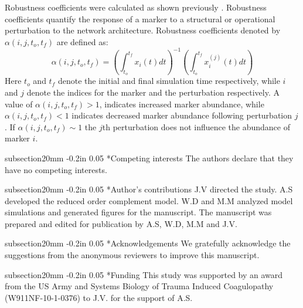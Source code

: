 \documentclass[12pt]{article}
\makeatletter
\renewcommand\section{\@startsection
	{subsection}{2}{0mm}
	{-0.2in}
	{0.05\baselineskip}
	{\normalfont\large\bfseries}}
\makeatother
\begin{document}
Robustness coefficients were calculated as shown previously \cite{Tasseff:2011aa}.
Robustness coefficients quantify the response of a marker to a structural or operational perturbation to the network architecture.
Robustness coefficients denoted by $\alpha\left(i,j,t_{o},t_{f}\right)$ are defined as:
\begin{equation}
\alpha\left(i,j,t_{o},t_{f}\right)=\left(\displaystyle\int_{t_{o}}^{t_{f}}x_{i}\left(t\right)dt\right)^{-1}\left(\displaystyle\int_{t_{o}}^{t_{f}}x^{(j)}_{i}\left(t\right)dt\right)
\end{equation}
Here $t_o$ and $t_f$ denote the initial and final simulation time respectively, while $i$ and $j$ denote the indices for the marker and the perturbation respectively.
A value of $\alpha\left(i,j,t_{o},t_{f}\right)>1$, indicates increased marker abundance, while $\alpha\left(i,j,t_{o},t_{f}\right)<1$ indicates decreased marker abundance following perturbation $j$. If $\alpha\left(i,j,t_{o},t_{f}\right)\sim{1}$ the $j$th perturbation does not influence the abundance of marker $i$.


\clearpage

\section*{Competing interests}
The authors declare that they have no competing interests.

\section*{Author's contributions}
J.V directed the study. A.S developed the reduced order complement model.
W.D and M.M analyzed model simulations and generated figures for the manuscript.
The manuscript was prepared and edited for publication by A.S, W.D, M.M and J.V.

\section*{Acknowledgements}
We gratefully acknowledge the suggestions from the anonymous reviewers to improve this manuscript.

\section*{Funding}
This study was supported by an award from the US Army and Systems Biology of Trauma Induced Coagulopathy (W911NF-10-1-0376) to J.V. for the support of A.S.
\end{document}
